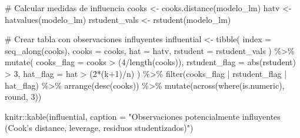 \documentclass[
  spanish,
  11pt,
  a4paper,
  DIV=11,
  numbers=noendperiod]{scrartcl}
\newenvironment{Shaded}{\begin{snugshade}}{\end{snugshade}}
\newcommand{\AttributeTok}[1]{\textcolor[rgb]{0.40,0.45,0.13}{#1}}
\newcommand{\CommentTok}[1]{\textcolor[rgb]{0.37,0.37,0.37}{#1}}
\newcommand{\DecValTok}[1]{\textcolor[rgb]{0.68,0.00,0.00}{#1}}
\newcommand{\FunctionTok}[1]{\textcolor[rgb]{0.28,0.35,0.67}{#1}}
\newcommand{\NormalTok}[1]{\textcolor[rgb]{0.00,0.23,0.31}{#1}}
\newcommand{\OtherTok}[1]{\textcolor[rgb]{0.00,0.23,0.31}{#1}}
\newcommand{\SpecialCharTok}[1]{\textcolor[rgb]{0.37,0.37,0.37}{#1}}
\newcommand{\StringTok}[1]{\textcolor[rgb]{0.13,0.47,0.30}{#1}}
\begin{document}
\begin{Shaded}
\begin{Highlighting}[numbers=left,,]
\CommentTok{\# Calcular medidas de influencia}
\NormalTok{cooks }\OtherTok{\textless{}{-}} \FunctionTok{cooks.distance}\NormalTok{(modelo\_lm)}
\NormalTok{hatv  }\OtherTok{\textless{}{-}} \FunctionTok{hatvalues}\NormalTok{(modelo\_lm)}
\NormalTok{rstudent\_vals }\OtherTok{\textless{}{-}} \FunctionTok{rstudent}\NormalTok{(modelo\_lm)}

\CommentTok{\# Crear tabla con observaciones influyentes}
\NormalTok{influential }\OtherTok{\textless{}{-}} \FunctionTok{tibble}\NormalTok{(}
  \AttributeTok{index =} \FunctionTok{seq\_along}\NormalTok{(cooks),}
  \AttributeTok{cooks =}\NormalTok{ cooks,}
  \AttributeTok{hat =}\NormalTok{ hatv,}
  \AttributeTok{rstudent =}\NormalTok{ rstudent\_vals}
\NormalTok{) }\SpecialCharTok{\%\textgreater{}\%}
  \FunctionTok{mutate}\NormalTok{(}
    \AttributeTok{cooks\_flag =}\NormalTok{ cooks }\SpecialCharTok{\textgreater{}}\NormalTok{ (}\DecValTok{4}\SpecialCharTok{/}\FunctionTok{length}\NormalTok{(cooks)),}
    \AttributeTok{rstudent\_flag =} \FunctionTok{abs}\NormalTok{(rstudent) }\SpecialCharTok{\textgreater{}} \DecValTok{3}\NormalTok{,}
    \AttributeTok{hat\_flag =}\NormalTok{ hat }\SpecialCharTok{\textgreater{}}\NormalTok{ (}\DecValTok{2}\SpecialCharTok{*}\NormalTok{(k}\SpecialCharTok{+}\DecValTok{1}\NormalTok{)}\SpecialCharTok{/}\NormalTok{n)}
\NormalTok{  ) }\SpecialCharTok{\%\textgreater{}\%}
  \FunctionTok{filter}\NormalTok{(cooks\_flag }\SpecialCharTok{|}\NormalTok{ rstudent\_flag }\SpecialCharTok{|}\NormalTok{ hat\_flag) }\SpecialCharTok{\%\textgreater{}\%}
  \FunctionTok{arrange}\NormalTok{(}\FunctionTok{desc}\NormalTok{(cooks)) }\SpecialCharTok{\%\textgreater{}\%}
  \FunctionTok{mutate}\NormalTok{(}\FunctionTok{across}\NormalTok{(}\FunctionTok{where}\NormalTok{(is.numeric), round, }\DecValTok{3}\NormalTok{))}

\NormalTok{knitr}\SpecialCharTok{::}\FunctionTok{kable}\NormalTok{(influential, }\AttributeTok{caption =} \StringTok{"Observaciones potencialmente }
\StringTok{             influyentes (Cook’s distance, leverage, residuos studentizados)"}\NormalTok{)}
\end{Highlighting}
\end{Shaded}
\end{document}
